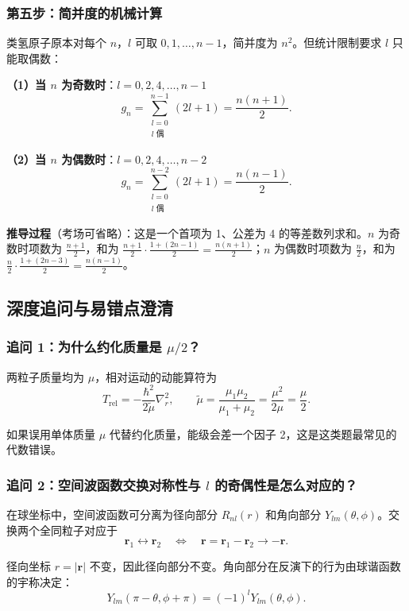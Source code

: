 \subsubsection{第五步：简并度的机械计算}

类氢原子原本对每个 $n$，$l$ 可取 $0, 1, \dots, n-1$，简并度为 $n^2$。但统计限制要求 $l$ 只能取偶数：

\textbf{（1）当 $n$ 为奇数时}：$l = 0, 2, 4, \dots, n-1$
\[
g_n = \sum_{\substack{l=0 \\ l\text{ 偶}}}^{n-1} (2l+1) = \boxed{\frac{n(n+1)}{2}}.
\]

\textbf{（2）当 $n$ 为偶数时}：$l = 0, 2, 4, \dots, n-2$
\[
g_n = \sum_{\substack{l=0 \\ l\text{ 偶}}}^{n-2} (2l+1) = \boxed{\frac{n(n-1)}{2}}.
\]

\textbf{推导过程}（考场可省略）：这是一个首项为 1、公差为 4 的等差数列求和。$n$ 为奇数时项数为 $\frac{n+1}{2}$，和为 $\frac{n+1}{2} \cdot \frac{1 + (2n-1)}{2} = \frac{n(n+1)}{2}$；$n$ 为偶数时项数为 $\frac{n}{2}$，和为 $\frac{n}{2} \cdot \frac{1 + (2n-3)}{2} = \frac{n(n-1)}{2}$。

\subsection{深度追问与易错点澄清}

\subsubsection*{追问 1：为什么约化质量是 $\mu/2$？}

两粒子质量均为 $\mu$，相对运动的动能算符为
\[
T_{\text{rel}} = -\frac{\hbar^2}{2\tilde{\mu}} \nabla_r^2, \qquad \tilde{\mu} = \frac{\mu_1 \mu_2}{\mu_1 + \mu_2} = \frac{\mu^2}{2\mu} = \frac{\mu}{2}.
\]

如果误用单体质量 $\mu$ 代替约化质量，能级会差一个因子 2，这是这类题最常见的代数错误。

\subsubsection*{追问 2：空间波函数交换对称性与 $l$ 的奇偶性是怎么对应的？}

在球坐标中，空间波函数可分离为径向部分 $R_{nl}(r)$ 和角向部分 $Y_{lm}(\theta, \phi)$。交换两个全同粒子对应于
\[
\bm{r}_1 \leftrightarrow \bm{r}_2 \quad \Longleftrightarrow \quad \bm{r} = \bm{r}_1 - \bm{r}_2 \to -\bm{r}.
\]

径向坐标 $r = |\bm{r}|$ 不变，因此径向部分不变。角向部分在反演下的行为由球谐函数的宇称决定：
\[
Y_{lm}(\pi - \theta, \phi + \pi) = (-1)^l Y_{lm}(\theta, \phi).
\]

